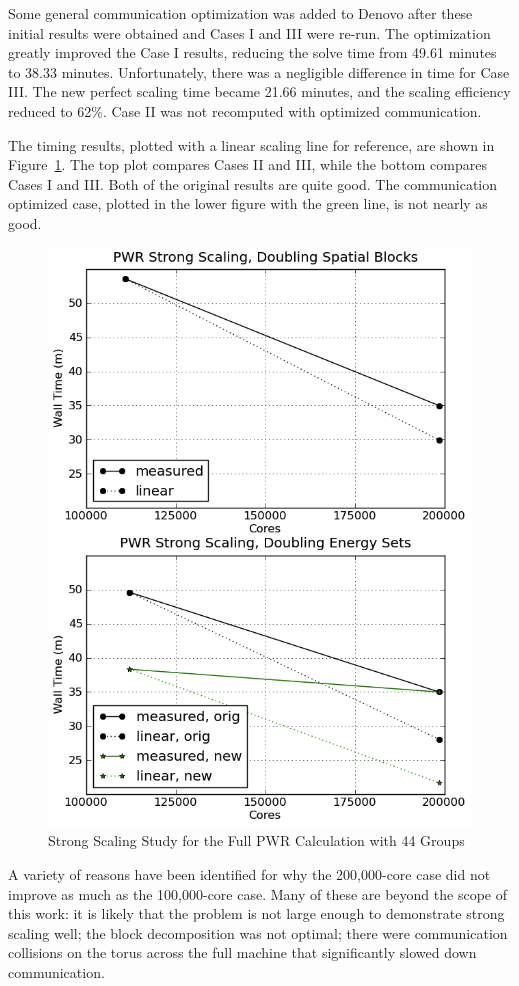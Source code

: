 Some general communication optimization was added to Denovo after these initial results were obtained and Cases I and III were re-run. The optimization greatly improved the Case I results, reducing the solve time from 49.61 minutes to 38.33 minutes. Unfortunately, there was a negligible difference in time for Case III. The new perfect scaling time became 21.66 minutes, and the scaling efficiency reduced to 62\%. Case II was not recomputed with optimized communication.

The timing results, plotted with a linear scaling line for reference, are shown in Figure~\ref{fig:PWRstrongScaling}. The top plot compares Cases II and III, while the bottom compares Cases I and III. Both of the original results are quite good. The communication optimized case, plotted in the lower figure with the green line, is not nearly as good.
%
\begin{figure}[!h]
  \begin{center}
    \includegraphics [width=.7\textwidth, height=.75\textheight ] {PWRstrongScaling}
  \end{center}
  \caption{Strong Scaling Study for the Full PWR Calculation with 44 Groups}
  \label{fig:PWRstrongScaling}
\end{figure}

A variety of reasons have been identified for why the 200,000-core case did not improve as much as the 100,000-core case. Many of these are beyond the scope of this work: it is likely that the problem is not large enough to demonstrate strong scaling well; the block decomposition was not optimal; there were communication collisions on the torus across the full machine that significantly slowed down communication. 

